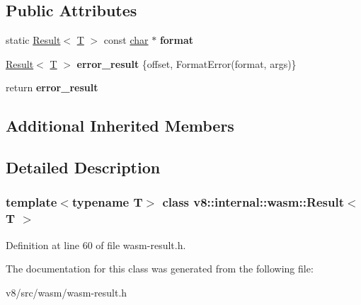 \subsection*{Public Attributes}
\begin{DoxyCompactItemize}
\item 
\mbox{\label{classv8_1_1internal_1_1wasm_1_1Result_a494e7c77d29b8d89aaf618bdc4ac9001}} 
static \mbox{\hyperlink{classv8_1_1internal_1_1wasm_1_1Result}{Result}}$<$ \mbox{\hyperlink{classv8_1_1internal_1_1torque_1_1T}{T}} $>$ const \mbox{\hyperlink{classchar}{char}} $\ast$ {\bfseries format}
\item 
\mbox{\label{classv8_1_1internal_1_1wasm_1_1Result_a109f0c04b208e47dbf0a9165efef35b5}} 
\mbox{\hyperlink{classv8_1_1internal_1_1wasm_1_1Result}{Result}}$<$ \mbox{\hyperlink{classv8_1_1internal_1_1torque_1_1T}{T}} $>$ {\bfseries error\+\_\+result} \{offset, Format\+Error(format, args)\}
\item 
\mbox{\label{classv8_1_1internal_1_1wasm_1_1Result_a7fb414404e86c4f63705f3f2790ed15b}} 
return {\bfseries error\+\_\+result}
\end{DoxyCompactItemize}
\subsection*{Additional Inherited Members}


\subsection{Detailed Description}
\subsubsection*{template$<$typename T$>$\newline
class v8\+::internal\+::wasm\+::\+Result$<$ T $>$}



Definition at line 60 of file wasm-\/result.\+h.



The documentation for this class was generated from the following file\+:\begin{DoxyCompactItemize}
\item 
v8/src/wasm/wasm-\/result.\+h\end{DoxyCompactItemize}
